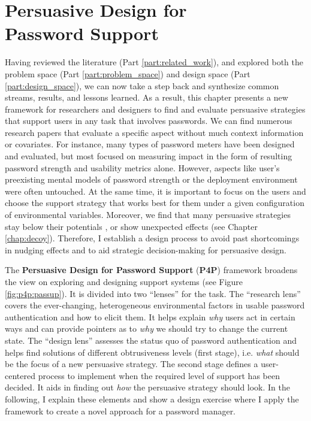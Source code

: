 
\chapter[Persuasive Design for Password Support (P4P)]{Persuasive Design for \\ Password Support}\label{chap:perdespassup}
Having reviewed the literature (Part \ref{part:related_work}), and explored both the problem space (Part \ref{part:problem_space}) and design space (Part \ref{part:design_space}), we can now take a step back and synthesize common streams, results, and lessons learned. 
As a result, this chapter presents a new framework for researchers and designers to find and evaluate persuasive strategies that support users in any task that involves passwords. 
We can find numerous research papers that evaluate a specific aspect without much context information or covariates. For instance, many types of password meters have been designed and evaluated, but most focused on measuring impact in the form of resulting password strength and usability metrics alone. However, aspects like user's preexisting mental models of password strength or the deployment environment were often untouched. At the same time, it is important to focus on the users and choose the support strategy that works best for them under a given configuration of environmental variables. 
Moreover, we find that many persuasive strategies stay below their potentials \cite{Renaud2017LessonsLearnedNudges}, or show unexpected effects (see Chapter \ref{chap:decoy}). Therefore, I establish a design process to avoid past shortcomings in nudging effects and to aid strategic decision-making for persuasive design. 


The \textbf{Persuasive Design for Password Support} (\textbf{P4P}) framework broadens the view on exploring and designing support systems (see Figure \ref{fig:p4p:passup}). It is divided into two ``lenses'' for the task. The ``research lens'' covers the ever-changing, heterogeneous environmental factors in usable password authentication and how to elicit them. It helps explain \textit{why} users act in certain ways and can provide pointers as to \textit{why} we should try to change the current state. The ``design lens'' assesses the status quo of password authentication and helps find solutions of different obtrusiveness levels (first stage), i.e. \textit{what} should be the focus of a new persuasive strategy. The second stage defines a user-centered process to implement when the required level of support has been decided. It aids in finding out \textit{how} the persuasive strategy should look. In the following, I explain these elements and show a design exercise where I apply the framework to create a novel approach for a password manager. 

